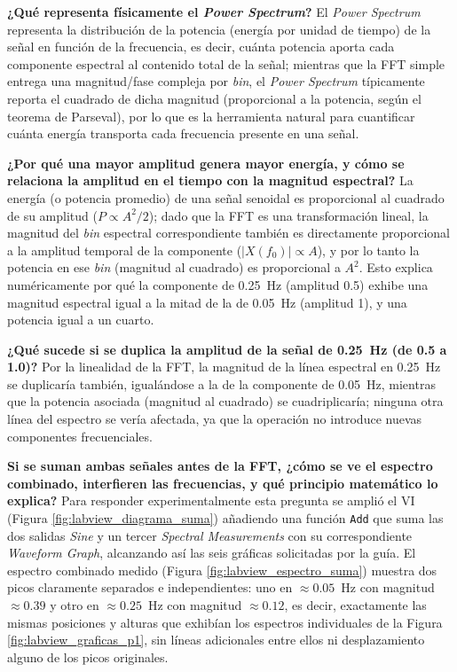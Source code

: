 \documentclass[conference]{IEEEtran}
\begin{document}
\textbf{¿Qué representa físicamente el \textit{Power Spectrum}?} El \textit{Power Spectrum} representa la distribución de la potencia (energía por unidad de tiempo) de la señal en función de la frecuencia, es decir, cuánta potencia aporta cada componente espectral al contenido total de la señal; mientras que la FFT simple entrega una magnitud/fase compleja por \textit{bin}, el \textit{Power Spectrum} típicamente reporta el cuadrado de dicha magnitud (proporcional a la potencia, según el teorema de Parseval), por lo que es la herramienta natural para cuantificar cuánta energía transporta cada frecuencia presente en una señal.

\textbf{¿Por qué una mayor amplitud genera mayor energía, y cómo se relaciona la amplitud en el tiempo con la magnitud espectral?} La energía (o potencia promedio) de una señal senoidal es proporcional al cuadrado de su amplitud ($P\propto A^2/2$); dado que la FFT es una transformación lineal, la magnitud del \textit{bin} espectral correspondiente también es directamente proporcional a la amplitud temporal de la componente ($|X(f_0)|\propto A$), y por lo tanto la potencia en ese \textit{bin} (magnitud al cuadrado) es proporcional a $A^2$. Esto explica numéricamente por qué la componente de 0.25~Hz (amplitud 0.5) exhibe una magnitud espectral igual a la mitad de la de 0.05~Hz (amplitud 1), y una potencia igual a un cuarto.

\textbf{¿Qué sucede si se duplica la amplitud de la señal de 0.25~Hz (de 0.5 a 1.0)?} Por la linealidad de la FFT, la magnitud de la línea espectral en 0.25~Hz se duplicaría también, igualándose a la de la componente de 0.05~Hz, mientras que la potencia asociada (magnitud al cuadrado) se cuadriplicaría; ninguna otra línea del espectro se vería afectada, ya que la operación no introduce nuevas componentes frecuenciales.

\textbf{Si se suman ambas señales antes de la FFT, ¿cómo se ve el espectro combinado, interfieren las frecuencias, y qué principio matemático lo explica?} Para responder experimentalmente esta pregunta se amplió el VI (Figura \ref{fig:labview_diagrama_suma}) añadiendo una función \texttt{Add} que suma las dos salidas \textit{Sine} y un tercer \textit{Spectral Measurements} con su correspondiente \textit{Waveform Graph}, alcanzando así las seis gráficas solicitadas por la guía. El espectro combinado medido (Figura \ref{fig:labview_espectro_suma}) muestra dos picos claramente separados e independientes: uno en $\approx0.05$~Hz con magnitud $\approx0.39$ y otro en $\approx0.25$~Hz con magnitud $\approx0.12$, es decir, exactamente las mismas posiciones y alturas que exhibían los espectros individuales de la Figura \ref{fig:labview_graficas_p1}, sin líneas adicionales entre ellos ni desplazamiento alguno de los picos originales.
\end{document}
